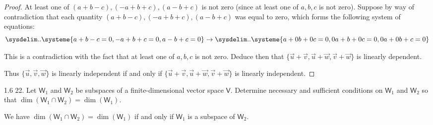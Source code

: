 \documentclass[11pt]{article}
\newcommand{\br}[1]{\left(#1\right)}
\newcommand{\cbr}[1]{\{#1\}}
\begin{document}
\begin{proof}
     \color{black}{}At least one of $\br{a+b-c}, \br{-a+b+c}, \br{a-b+c}$ is not zero (since at least one of $a,b,c$ is not zero). Suppose by way of contradiction that each quantity $\br{a+b-c}, \br{-a+b+c}, \br{a-b+c}$ was equal to zero, which forms the following system of equations:
    \begin{equation*}
        \sysdelim..\systeme{
            a+b-c = 0,
            -a+b+c = 0,
            a-b+c = 0
        }\to
        \sysdelim..\systeme{
            a+0b+0c = 0,
            0a+b+0c = 0,
            0a+0b+c = 0
        }
    \end{equation*}
    
    This is a contradiction with the fact that at least one of $a,b,c$ is not zero. Deduce then that $\cbr{\vec{u}+\vec{v},\vec{u}+\vec{w},\vec{v}+\vec{w}}$ is linearly dependent.

Thus $\cbr{\vec{u},\vec{v},\vec{w}}$ is linearly independent if and only if $\cbr{\vec{u}+\vec{v},\vec{u}+\vec{w},\vec{v}+\vec{w}}$ is linearly independent.
\end{proof}

1.6 22. Let $\mathsf{W}_1$ and $\mathsf{W}_2$ be subspaces of a finite-dimensional vector space $\mathsf{V}$. Determine necessary and sufficient conditions on $\mathsf{W}_1$ and $\mathsf{W}_2$ so that $\dim(\mathsf{W}_1\cap\mathsf{W}_2) = \dim(\mathsf{W}_1)$.

We have $\dim(\mathsf{W}_1\cap\mathsf{W}_2) = \dim(\mathsf{W}_1)$ if and only if $\mathsf{W}_1$ is a subspace of $\mathsf{W}_2$.
\end{document}
